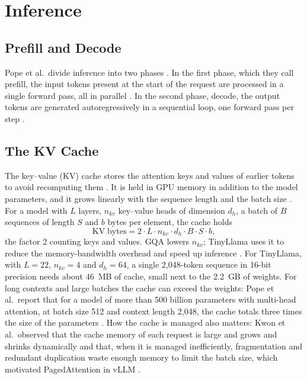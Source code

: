 \section{Inference}
\label{sec:ch2-inference}

\subsection{Prefill and Decode}
\label{sec:ch2-prefill}

Pope et al.\ divide inference into two phases \cite{pope2023efficiently}. In the first phase, which they call prefill, the input tokens present at the start of the request are processed in a single forward pass, all in parallel \cite{pope2023efficiently}. In the second phase, decode, the output tokens are generated autoregressively in a sequential loop, one forward pass per step \cite{pope2023efficiently}.

\subsection{The KV Cache}
\label{sec:ch2-kvcache}

The key--value (KV) cache stores the attention keys and values of earlier tokens to avoid recomputing them \cite{liu2024kivi}. It is held in GPU memory in addition to the model parameters, and it grows linearly with the sequence length and the batch size \cite{zhang2023h2o}. For a model with $L$ layers, $n_{kv}$ key--value heads of dimension $d_h$, a batch of $B$ sequences of length $S$ and $b$ bytes per element, the cache holds
\begin{equation}
  \mathrm{KV\;bytes} = 2 \cdot L \cdot n_{kv} \cdot d_h \cdot B \cdot S \cdot b,
  \label{eq:ch2-kvsize}
\end{equation}
the factor 2 counting keys and values. GQA lowers $n_{kv}$; TinyLlama uses it to reduce the memory-bandwidth overhead and speed up inference \cite{zhang2024tinyllama}. For TinyLlama, with $L = 22$, $n_{kv} = 4$ and $d_h = 64$, a single 2{,}048-token sequence in 16-bit precision needs about 46~MB of cache, small next to the 2.2~GB of weights. For long contexts and large batches the cache can exceed the weights: Pope et al.\ report that for a model of more than 500 billion parameters with multi-head attention, at batch size 512 and context length 2{,}048, the cache totals three times the size of the parameters \cite{pope2023efficiently}. How the cache is managed also matters: Kwon et al.\ observed that the cache memory of each request is large and grows and shrinks dynamically and that, when it is managed inefficiently, fragmentation and redundant duplication waste enough memory to limit the batch size, which motivated PagedAttention in vLLM \cite{kwon2023vllm}.

